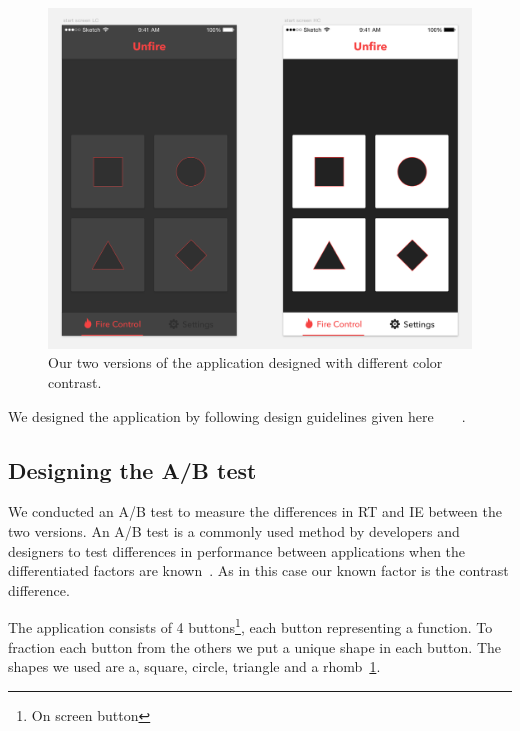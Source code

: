 \documentclass[runningheads,a4paper]{llncs}
\begin{document}
\begin{figure}
	\centering
	\includegraphics[width=\textwidth]{application}
	\caption{Our two versions of the application designed with different color contrast.
	\label{fig:application}}
\end{figure}

We designed the application by following design guidelines given here~\cite{hoober2011designing}~\cite{johnson2013designing}~\cite{gong2004guidelines}~\cite{norman2013design}.

\subsection{Designing the A/B test}
We conducted an A/B test to measure the differences in RT and IE between the two versions. An A/B test is a commonly used method by developers and designers to test differences in performance between applications when the differentiated factors are known~\cite{johnson2013designing}. As in this case our known factor is the contrast difference. 

The application consists of 4 buttons\footnote{On screen button}, each button representing a function. To fraction each button from the others we put a unique shape in each button. The shapes we used are a, square, circle, triangle and a rhomb~\ref{fig:application}.
\end{document}

